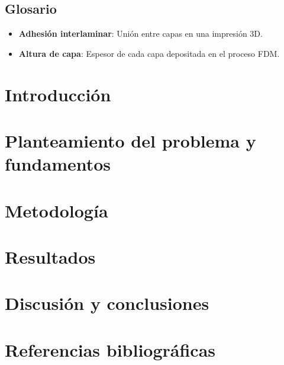 \documentclass[12pt]{report}
\begin{document}
\section*{Glosario}
\begin{itemize}
\item \textbf{Adhesión interlaminar}: Unión entre capas en una impresión 3D.
\item \textbf{Altura de capa}: Espesor de cada capa depositada en el proceso FDM.
\end{itemize}


\chapter{Introducción}



\chapter{Planteamiento del problema y fundamentos}
 


\chapter{Metodología}
\vspace{-30pt}




\chapter{Resultados}


\chapter{Discusión y conclusiones}


\chapter{Referencias bibliográficas}
\printbibliography[heading=none] 
\end{document}
